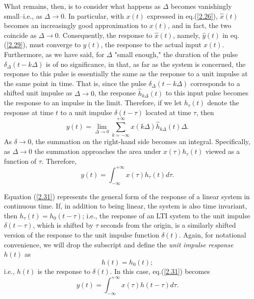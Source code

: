 \documentclass[a4paper,10pt,twoside]{book}
\begin{document}
What remains, then, is to consider what happens as $\Delta$ becomes vanishingly small--i.e., as $\Delta\to 0$. In particular, with $x(t)$ expressed in eq.\;(\ref{2.26}), $\hat{x}(t)$ becomes an increasingly good approximation to $x(t)$, and in fact, the two coincide as $\Delta\to 0$. Consequently, the response to $\hat{x}(t)$, namely, $\hat{y}(t)$ in eq.\;(\ref{2.29}), must converge to $y(t)$, the response to the actual input $x(t)$. Furthermore, as we have said, for $\Delta$ "small enough," the duration of the pulse $\delta_\Delta(t-k\Delta)$ is of no significance, in that, as far as the system is concerned, the response to this pulse is essentially the same as the response to a unit impulse at the same point in time. That is, since the pulse $\delta_\Delta(t-k\Delta)$ corresponds to a shifted unit impulse as $\Delta\to 0$, the response $\hat{h}_{k\Delta}(t)$ to this input pulse becomes the response to an impulse in the limit. Therefore, if we let $h_\tau(t)$ denote the response at time $t$ to a unit impulse $\delta(t-\tau)$ located at time $\tau$, then
\begin{equation}
    y(t) = \lim_{\Delta\to0}\sum_{k=-\infty}^{+\infty}x(k\Delta)\hat{h}_{k\Delta}(t)\Delta.
    \label{2.30}
\end{equation}
As $\delta\to 0$, the summation on the right-hand side becomes an integral. Specifically, as $\Delta\to 0$ the summation approaches the area under $x(\tau)h_\tau(t)$ viewed as a function of $\tau$. Therefore,
\begin{equation}
    y(t) = \int_{-\infty}^{+\infty}x(\tau)h_{\tau}(t)d\tau.
    \label{2.31}
\end{equation}

Equation (\ref{2.31}) represents the general form of the response of a linear system in continuous time. If, in addition to being linear, the system is also time invariant, then $h_\tau(t)=h_0(t-\tau)$; i.e., the response of an LTI system to the unit impulse $\delta(t-\tau)$, which is shifted by $\tau$ seconds from the origin, is a similarly shifted version of the response to the unit impulse function $\delta(t)$. Again, for notational convenience, we will drop the subscript and define the \textit{unit impulse response} $h(t)$ as
\begin{equation}
    h(t)=h_0(t);
\end{equation}
i.e., $h(t)$ is the response to $\delta(t)$. In this case, eq.\;(\ref{2.31}) becomes
\begin{equation}
    \boxed{ y(t) = \int_{-\infty}^{+\infty}x(\tau)h(t-\tau)d\tau.}
    \label{2.33}
\end{equation}
\end{document}
